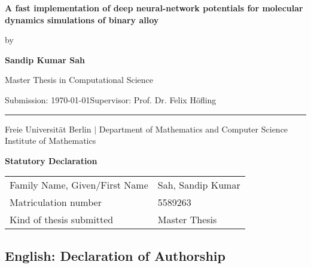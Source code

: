 \documentclass[a4paper,11pt,oneside]{article}
\newcommand{\mylastname}{Sah}
\newcommand{\myfirstname}{Sandip Kumar}
\newcommand{\mynumber}{5589263}
\newcommand{\myname}{\myfirstname{} \mylastname{}}
\newcommand{\mytitle}{A fast implementation of deep neural-network potentials for molecular dynamics simulations of binary alloy}
\newcommand{\mysupervisor}{Prof. Dr. Felix Höfling}
\begin{document}

\thispagestyle{empty}

\vspace*{40mm}
\begin{center}
  \huge
  \textbf{\mytitle}
\end{center}
\vspace*{4mm}
\begin{center}
  \Large by
\end{center}
\vspace*{4mm}
\begin{center}
  \LARGE
  \textbf{\myname}
\end{center}
\vspace*{20mm}
\begin{center}
  \Large
  Master Thesis in Computational Science
\end{center}
\vfill
\begin{flushleft}
  \large
  Submission: \today \hfill Supervisor: \mysupervisor \\
  \rule{\textwidth}{1pt}
\end{flushleft}
\begin{center}
  Freie Universität Berlin $|$ Department of Mathematics and Computer Science
Institute of Mathematics
\end{center}

\newpage
\thispagestyle{empty}

\begin{center}
  \Large \textbf{Statutory Declaration}
  \vspace*{8mm}
\end{center}

\begin{center}
  \begin{tabular}{|l|p{85mm}|}
    \hline
    Family Name, Given/First Name & \mylastname, \myfirstname \\
    Matriculation number          & \mynumber                 \\
    Kind of thesis submitted      & Master Thesis           \\
    \hline
  \end{tabular}
  \vspace*{8mm}
\end{center}

\subsection*{English: Declaration of Authorship}
\end{document}
